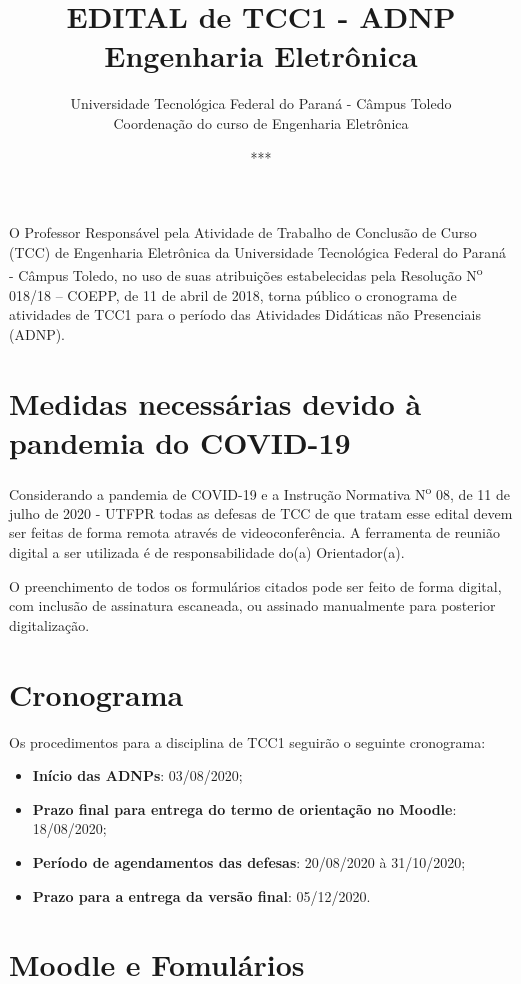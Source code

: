 \documentclass[a4paper, 12pt]{article}
\title{EDITAL de TCC1 - ADNP\\\textbf{Engenharia Eletrônica}}
\date{***}
\author{Universidade Tecnológica Federal do Paraná - Câmpus Toledo\\Coordenação do curso de Engenharia Eletrônica}
\newcommand{\utf}{Universidade Tecnológica Federal do Paraná - Câmpus Toledo}
\newcommand{\tcc}{Trabalho de Conclusão de Curso}
\begin{document}
    \maketitle
    
    O Professor Responsável pela Atividade de \tcc{ } (TCC) de Engenharia Eletrônica da \utf, no uso de suas atribuições estabelecidas pela Resolução N\textsuperscript{o} 018/18 – COEPP, de 11 de abril de 2018, torna público o cronograma de atividades de TCC1 para o período das Atividades Didáticas não Presenciais (ADNP).

    \section{Medidas necessárias devido à pandemia do COVID-19}

    Considerando a pandemia de COVID-19 e a Instrução Normativa N\textsuperscript{o} 08, de 11 de julho de 2020 - UTFPR todas as defesas de TCC de que tratam esse edital devem ser feitas de forma remota através de videoconferência. A ferramenta de reunião digital a ser utilizada é de responsabilidade do(a) Orientador(a).
    
    O preenchimento de todos os formulários citados pode ser feito de forma digital, com inclusão de assinatura escaneada, ou assinado manualmente para posterior digitalização.

    \section{Cronograma}
    \label{sec:CRO}
    
    Os procedimentos para a disciplina de TCC1 seguirão o seguinte cronograma:
    \begin{itemize}
    	\item \textbf{Início das ADNPs}: 03/08/2020;
    	\item \textbf{Prazo final para entrega do termo de orientação no Moodle}: 18/08/2020;
    	\item \textbf{Período de agendamentos das defesas}: 20/08/2020 à 31/10/2020;
    	\item \textbf{Prazo para a entrega da versão final}: 05/12/2020.
    \end{itemize}
    
    \section{Moodle e Fomulários}
    
\end{document}
